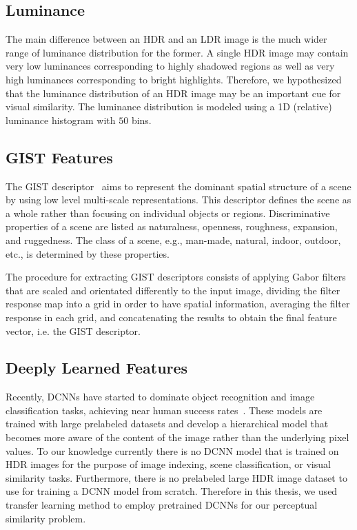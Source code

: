 \subsection{Luminance}
The main difference between an HDR and an LDR image is the much wider range of luminance distribution for the former. A single HDR image may contain very low luminances corresponding to highly shadowed regions as well as very high luminances corresponding to bright highlights. Therefore, we hypothesized that the luminance distribution of an HDR image may be an important cue for visual similarity. The luminance distribution is modeled using a 1D (relative) luminance histogram with $50$ bins.
\subsection{GIST Features}
The GIST descriptor~\cite{oliva2001modeling} aims to represent the dominant spatial structure of a scene by using low level multi-scale representations. This descriptor defines the scene as a whole rather than focusing on individual objects or regions. Discriminative properties of a scene are listed as naturalness, openness, roughness, expansion, and ruggedness. The class of a scene, e.g., man-made, natural, indoor, outdoor, etc., is determined by these properties.

The procedure for extracting GIST descriptors consists of applying Gabor filters that are scaled and orientated differently to the input image, dividing the filter response map into a grid in order to have spatial information, averaging the filter response in each grid, and concatenating the results to obtain the final feature vector, i.e. the GIST descriptor.

\subsection{Deeply Learned Features}
Recently, DCNNs have started to dominate object recognition and image classification tasks, achieving near human success rates~\cite{krizhevsky2012imagenet,simonyan2014very,zhou2017scene}. These models are trained with large prelabeled datasets and develop a hierarchical model that becomes more aware of the content of the image rather than the underlying pixel values. To our knowledge currently there is no DCNN model that is trained on HDR images for the purpose of image indexing, scene classification, or visual similarity tasks.
Furthermore, there is no prelabeled large HDR image dataset to use for training a DCNN model from scratch. Therefore in this thesis, we used transfer learning method to employ pretrained DCNNs for our perceptual similarity problem. 

